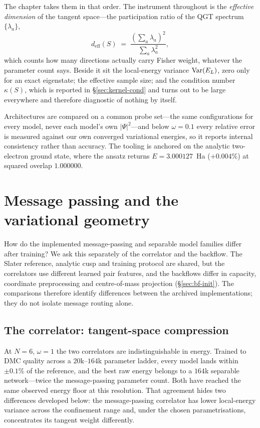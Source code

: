 \noindent The chapter takes them in that order. The instrument throughout is the \emph{effective dimension} of the tangent space---the
participation ratio of the QGT spectrum $\{\lambda_a\}$,
\begin{equation}
  d_{\mathrm{eff}}(S) \;=\; \frac{\left(\sum_a \lambda_a\right)^2}{\sum_a \lambda_a^2},
  \label{eq:deff}
\end{equation}
which counts how many directions actually carry Fisher weight, whatever the parameter
count says. Beside it sit the local-energy variance $\mathrm{Var}(E_L)$, zero only for an exact
eigenstate; the effective sample size; and the condition number $\kappa(S)$, which is
reported in \S\ref{sec:kernel-cond} and turns out to be large everywhere and therefore
diagnostic of nothing by itself.

Architectures are compared on a common probe set---the same configurations for every model,
never each model's own $|\Psi|^2$---and below $\omega=0.1$ every relative error is measured
against our own converged variational energies, so it reports internal consistency rather
than accuracy. The tooling is anchored on the analytic two-electron ground state, where the
ansatz returns $E=3.000127$~Ha ($+0.004\%$) at squared overlap $1.000000$.

\section{Message passing and the variational geometry}
\label{sec:kernel-q1}

How do the implemented message-passing and separable model families differ after training?
We ask this separately of the correlator and the backflow. The Slater reference, analytic
cusp and training protocol are shared, but the correlators use different learned pair
features, and the backflows differ in capacity, coordinate preprocessing and centre-of-mass
projection (\S\ref{sec:bf-init}). The comparisons therefore identify differences between the
archived implementations; they do not isolate message routing alone.

\subsection{The correlator: tangent-space compression}
\label{sec:kernel-q1a}

At $N=6$, $\omega=1$ the two correlators are indistinguishable in energy. Trained to DMC
quality across a $20$k--$164$k parameter ladder, every model lands within $\pm0.1\%$ of the
reference, and the best raw energy belongs to a $164$k separable network---twice the
message-passing parameter count. Both have reached the same observed energy floor at this
resolution. That agreement hides two differences developed below: the message-passing
correlator has lower local-energy variance across the confinement range and, under the
chosen parametrisations, concentrates its tangent weight differently.

